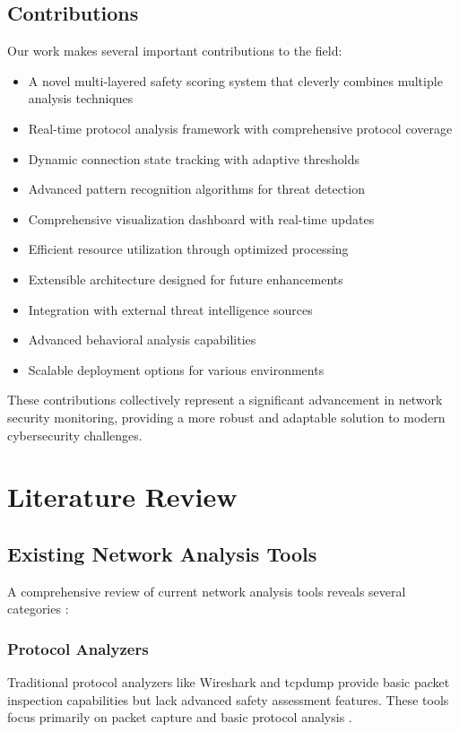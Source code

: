 \documentclass[conference]{IEEEtran}
\newcommand{\wireshark}{Wireshark}
\begin{document}
\subsection{Contributions}
Our work makes several important contributions to the field:
\begin{itemize}[leftmargin=*]
    \item A novel multi-layered safety scoring system that cleverly combines multiple analysis techniques
    \item Real-time protocol analysis framework with comprehensive protocol coverage
    \item Dynamic connection state tracking with adaptive thresholds
    \item Advanced pattern recognition algorithms for threat detection
    \item Comprehensive visualization dashboard with real-time updates
    \item Efficient resource utilization through optimized processing
    \item Extensible architecture designed for future enhancements
    \item Integration with external threat intelligence sources
    \item Advanced behavioral analysis capabilities
    \item Scalable deployment options for various environments
\end{itemize}

These contributions collectively represent a significant advancement in network security monitoring, providing a more robust and adaptable solution to modern cybersecurity challenges.

\section{Literature Review}
\label{sec:literature}

\subsection{Existing Network Analysis Tools}
A comprehensive review of current network analysis tools reveals several categories \cite{ref5,ref6}:

\subsubsection{Protocol Analyzers}
Traditional protocol analyzers like \wireshark{} and tcpdump provide basic packet inspection capabilities but lack advanced safety assessment features. These tools focus primarily on packet capture and basic protocol analysis \cite{ref7}.
\end{document}
